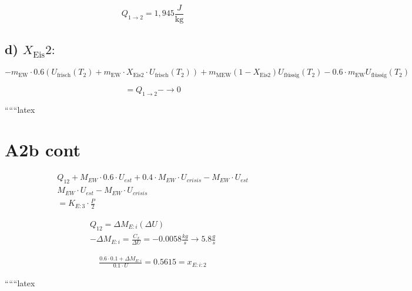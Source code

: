 \[
Q_{1 \rightarrow 2} = 1,945 \frac{J}{\text{kg}}
\]

\subsection*{d) $X_{\text{Eis}} 2:$}

\[
- m_{\text{EW}} \cdot 0.6 \left( U_{\text{frisch}} (T_2) + m_{\text{EW}} \cdot X_{\text{Eis}2} \cdot U_{\text{frisch}} (T_2) \right) + m_{\text{MEW}} (1 - X_{\text{Eis}2}) U_{\text{flüssig}} (T_2) - 0.6 \cdot m_{\text{EW}} U_{\text{flüssig}} (T_2)
\]

\[
= Q_{1 \rightarrow 2} - \rightarrow 0
\]

``````latex


\section*{A2b cont}

\begin{align*}
Q_{12} + M_{EW} \cdot 0.6 \cdot U_{est} + 0.4 \cdot M_{EW} \cdot U_{crisis} - M_{EW} \cdot U_{est} \\
M_{EW} \cdot U_{est} - M_{EW} \cdot U_{crisis} \\
= K_{E:3} \cdot \frac{P}{2}
\end{align*}

\begin{align*}
Q_{12} = \Delta M_{E:i} \left( \Delta U \right) \\
-\Delta M_{E:i} = \frac{C_{x}}{\Delta U} = -0.0058 \frac{kg}{s} \rightarrow 5.8 \frac{g}{s}
\end{align*}

\begin{align*}
\frac{0.6 \cdot 0.1 + \Delta M_{E:i}}{0.1 \cdot U} = 0.5615 = x_{E:i:2}
\end{align*}

``````latex


